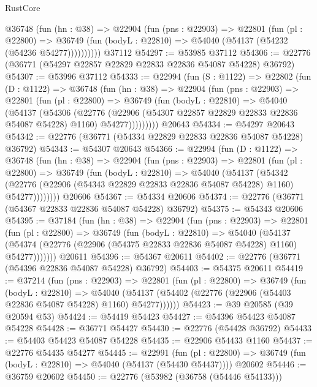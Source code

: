 \begin{lexlean}{RustCore}
\begin{coremodule}
        @36748
          (fun (hn : @38) =>
          @22904
            (fun (pns : @22903) =>
            @22801
              (fun (pl : @22800) =>
              @36749 (fun (bodyL : @22810) => @54040 (@54137 (@54232 (@54236 @54277))))))))))
    @37112
@54297 := @53985 @37112
@54306 := @22776 (@36771 (@54297 @22857 @22829 @22833 @22836 @54087 @54228) @36792)
@54307 := @53996 @37112
@54333 := @22994
    (fun (S : @1122) =>
    @22802
      (fun (D : @1122) =>
      @36748
        (fun (hn : @38) =>
        @22904
          (fun (pns : @22903) =>
          @22801
            (fun (pl : @22800) =>
            @36749
              (fun (bodyL : @22810) =>
              @54040
                (@54137
                  (@54306
                    (@22776
                      (@22906 (@54307 @22857 @22829 @22833 @22836 @54087 @54228) @1160)
                      @54277)))))))))
    @20643
@54334 := @54297 @20643
@54342 := @22776 (@36771 (@54334 @22829 @22833 @22836 @54087 @54228) @36792)
@54343 := @54307 @20643
@54366 := @22994
    (fun (D : @1122) =>
    @36748
      (fun (hn : @38) =>
      @22904
        (fun (pns : @22903) =>
        @22801
          (fun (pl : @22800) =>
          @36749
            (fun (bodyL : @22810) =>
            @54040
              (@54137
                (@54342
                  (@22776 (@22906 (@54343 @22829 @22833 @22836 @54087 @54228) @1160) @54277))))))))
    @20606
@54367 := @54334 @20606
@54374 := @22776 (@36771 (@54367 @22833 @22836 @54087 @54228) @36792)
@54375 := @54343 @20606
@54395 := @37184
    (fun (hn : @38) =>
    @22904
      (fun (pns : @22903) =>
      @22801
        (fun (pl : @22800) =>
        @36749
          (fun (bodyL : @22810) =>
          @54040
            (@54137
              (@54374 (@22776 (@22906 (@54375 @22833 @22836 @54087 @54228) @1160) @54277)))))))
    @20611
@54396 := @54367 @20611
@54402 := @22776 (@36771 (@54396 @22836 @54087 @54228) @36792)
@54403 := @54375 @20611
@54419 := @37214
    (fun (pns : @22903) =>
    @22801
      (fun (pl : @22800) =>
      @36749
        (fun (bodyL : @22810) =>
        @54040 (@54137 (@54402 (@22776 (@22906 (@54403 @22836 @54087 @54228) @1160) @54277))))))
@54423 := @39 @20585 (@39 @20594 @53)
@54424 := @54419 @54423
@54427 := @54396 @54423 @54087 @54228
@54428 := @36771 @54427
@54430 := @22776 (@54428 @36792)
@54433 := @54403 @54423 @54087 @54228
@54435 := @22906 @54433 @1160
@54437 := @22776 @54435 @54277
@54445 := @22991
    (fun (pl : @22800) => @36749 (fun (bodyL : @22810) => @54040 (@54137 (@54430 @54437))))
    @20602
@54446 := @36759 @20602
@54450 := @22776 (@53982 (@36758 (@54446 @54133)))

\end{coremodule}
\end{lexlean}
